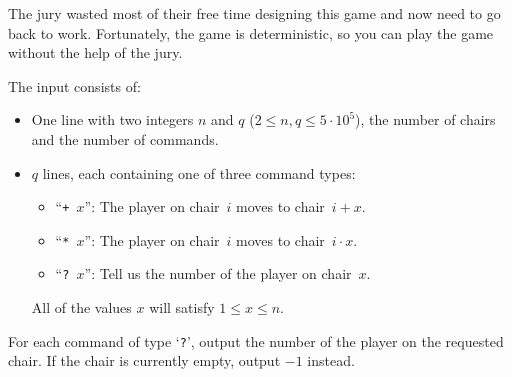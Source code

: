 The jury wasted most of their free time designing this game and now need to go back to work.
Fortunately, the game is deterministic, so you can play the game without the help of the jury.

\begin{Input}
The input consists of:
\begin{itemize}
  \item
  One line with two integers $n$ and $q$ ($2\leq n,q\leq5\cdot10^5$), the number of chairs and the number of commands.
  \item
  $q$ lines, each containing one of three command types:
  \begin{itemize}
  \item ``\texttt{+~$x$}'': The player on chair~$i$ moves to chair~$i+x$.
  \item ``\texttt{*~$x$}'': The player on chair~$i$ moves to chair~$i\cdot{}x$.
  \item ``\texttt{?~$x$}'': Tell us the number of the player on chair~$x$.
  \end{itemize}
  All of the values $x$ will satisfy $1 \leq x \leq n$.
  \end{itemize}
\end{Input}
\begin{Output}
  For each command of type `\texttt{?}', output the number of the player on the requested chair.
  If the chair is currently empty, output $-1$ instead.
\end{Output}
